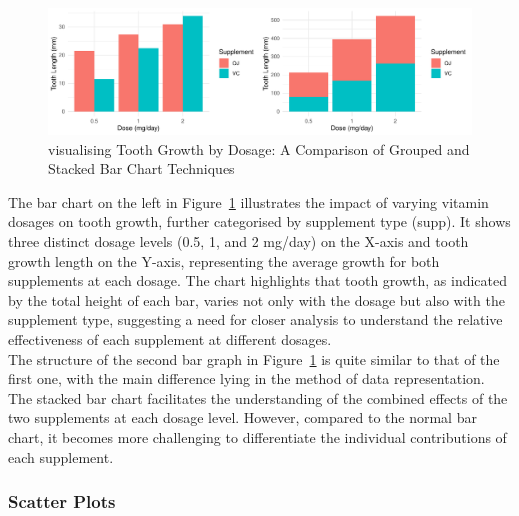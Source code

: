\documentclass{article}\usepackage[]{graphicx}\usepackage[]{xcolor}
\makeatletter
\def\maxwidth{ %
  \ifdim\Gin@nat@width>\linewidth
    \linewidth
  \else
    \Gin@nat@width
  \fi
}
\newenvironment{knitrout}{}{} %
\makeatother
\begin{document}
\begin{knitrout}\scriptsize
{}\color{fgcolor}\begin{figure}[H]

{\centering \includegraphics[width=\maxwidth]{figure/beamer-barcharts-1} 

}

\caption[visualising Tooth Growth by Dosage]{visualising Tooth Growth by Dosage: A Comparison of Grouped and Stacked Bar Chart Techniques}\label{fig:barcharts}
\end{figure}

\end{knitrout}

\noindent 
The bar chart on the left in Figure~\ref{fig:barcharts} illustrates the impact of varying vitamin dosages on tooth growth, further categorised by supplement type (supp). It shows three distinct dosage levels (0.5, 1, and 2 mg/day) on the X-axis and tooth growth length on the Y-axis, representing the average growth for both supplements at each dosage. The chart highlights that tooth growth, as indicated by the total height of each bar, varies not only with the dosage but also with the supplement type, suggesting a need for closer analysis to understand the relative effectiveness of each supplement at different dosages.\\

\noindent
The structure of the second bar graph in Figure~\ref{fig:barcharts} is quite similar to that of the first one, with the main difference lying in the method of data representation. The stacked bar chart facilitates the understanding of the combined effects of the two supplements at each dosage level. However, compared to the normal bar chart, it becomes more challenging to differentiate the individual contributions of each supplement.\\



\subsubsection{Scatter Plots}
\end{document}
